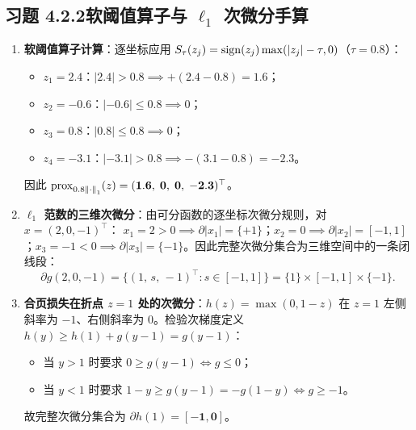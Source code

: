 \subsection*{习题 4.2.2\quad 软阈值算子与 $\ell_1$ 次微分手算}
\begin{enumerate}[label=(\alph*), leftmargin=1.8em]
  \item \textbf{软阈值算子计算}：逐坐标应用 $S_\tau(z_j) = \operatorname{sign}(z_j)\max(|z_j| - \tau, 0)$（$\tau = 0.8$）：
  \begin{itemize}
    \item $z_1 = 2.4$：$|2.4| > 0.8 \implies +(2.4 - 0.8) = 1.6$；
    \item $z_2 = -0.6$：$|-0.6| \le 0.8 \implies 0$；
    \item $z_3 = 0.8$：$|0.8| \le 0.8 \implies 0$；
    \item $z_4 = -3.1$：$|-3.1| > 0.8 \implies -(3.1 - 0.8) = -2.3$。
  \end{itemize}
  因此 $\operatorname{prox}_{0.8\left\|\cdot\right\|_1}(z) = \mathbf{(1.6,\; 0,\; 0,\; -2.3)^\top}$。

  \item \textbf{$\ell_1$ 范数的三维次微分}：由可分函数的逐坐标次微分规则，对 $x = (2, 0, -1)^\top$：
  $x_1 = 2 > 0 \implies \partial |x_1| = \{+1\}$；$x_2 = 0 \implies \partial |x_2| = [-1, 1]$；$x_3 = -1 < 0 \implies \partial |x_3| = \{-1\}$。因此完整次微分集合为三维空间中的一条闭线段：
  \[
    \partial g(2, 0, -1) = \big\{(1,\, s,\, -1)^\top : s \in [-1, 1]\big\} = \{1\} \times [-1, 1] \times \{-1\}.
  \]

  \item \textbf{合页损失在折点 $z = 1$ 处的次微分}：$h(z) = \max(0, 1 - z)$ 在 $z=1$ 左侧斜率为 $-1$、右侧斜率为 $0$。检验次梯度定义 $h(y) \ge h(1) + g(y - 1) = g(y - 1)$：
  \begin{itemize}
    \item 当 $y > 1$ 时要求 $0 \ge g(y - 1) \iff g \le 0$；
    \item 当 $y < 1$ 时要求 $1 - y \ge g(y - 1) = -g(1 - y) \iff g \ge -1$。
  \end{itemize}
  故完整次微分集合为 $\partial h(1) = \mathbf{[-1, 0]}$。
\end{enumerate}

